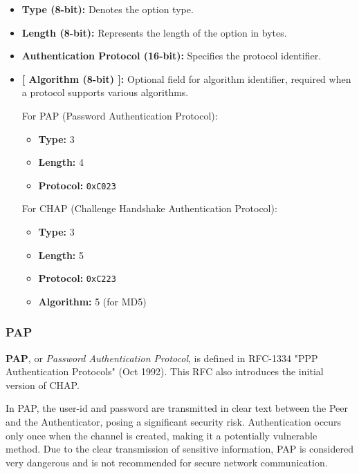\begin{itemize}
    \item \textbf{Type (8-bit):} Denotes the option type.
    \item \textbf{Length (8-bit):} Represents the length of the option in bytes.
    \item \textbf{Authentication Protocol (16-bit):} Specifies the protocol identifier.
    \item \textbf{[ Algorithm (8-bit) ]:} Optional field for algorithm identifier, required when a protocol supports various algorithms.

          For PAP (Password Authentication Protocol):
          \begin{itemize}
              \item \textbf{Type:} 3
              \item \textbf{Length:} 4
              \item \textbf{Protocol:} \texttt{0xC023}
          \end{itemize}

          For CHAP (Challenge Handshake Authentication Protocol):
          \begin{itemize}
              \item \textbf{Type:} 3
              \item \textbf{Length:} 5
              \item \textbf{Protocol:} \texttt{0xC223}
              \item \textbf{Algorithm:} 5 (for MD5)
          \end{itemize}
\end{itemize}


\subsubsection{PAP}
\textbf{PAP}, or \textit{Password Authentication Protocol}, is defined in RFC-1334 "PPP Authentication Protocols" (Oct 1992). This RFC also introduces the initial version of CHAP. 

In PAP, the user-id and password are transmitted in clear text between the Peer and the Authenticator, posing a significant security risk. Authentication occurs only once when the channel is created, making it a potentially vulnerable method. Due to the clear transmission of sensitive information, PAP is considered very dangerous and is not recommended for secure network communication.

